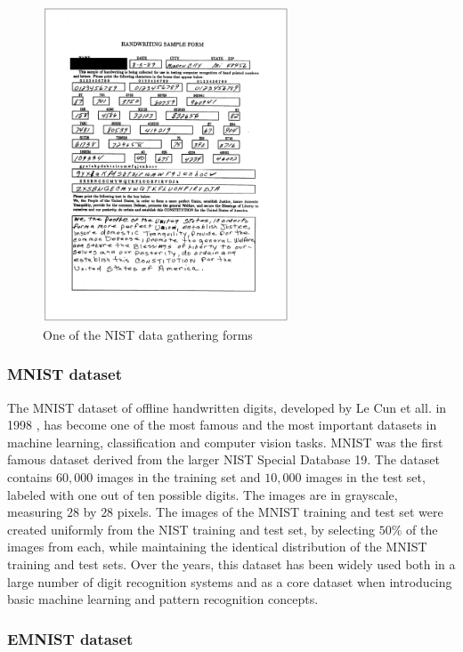 \documentclass[eng]{simposium}
\begin{document}
\begin{figure}[!ht] 
  \centering 
  \includegraphics[width=0.65\textwidth]{nist.png} 
  \caption{One of the NIST data gathering forms \cite{9}} 
  \label{fig:nist} 
\end{figure} 

\subsubsection{MNIST dataset} 

The MNIST dataset of offline handwritten digits, developed by Le Cun et all. in 1998 \cite{8}, 
has become one of the most famous and the most important datasets in machine learning,  
classification and computer vision tasks.  
MNIST was the first famous dataset derived from the larger NIST Special Database 19.  
The dataset contains $60,000$ images in the training set and $10,000$ images in the test set, labeled with one out of ten possible digits.  
The images are in grayscale, measuring $28$ by $28$ pixels.  
The images of the MNIST training and test set were created uniformly from the NIST training and test set,  
by selecting $50\%$ of the images from each, while maintaining the identical distribution of the MNIST training and test sets.  
Over the years, this dataset has been widely used both in a large number of digit recognition systems and as a core dataset  
when introducing basic machine learning and pattern recognition concepts.  

\subsubsection{EMNIST dataset} 
\end{document}
